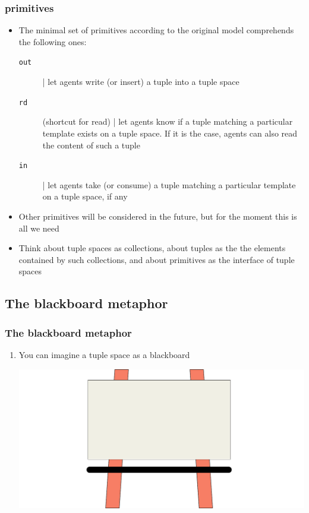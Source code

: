 \documentclass[presentation]{beamer}\mode<presentation>{\usetheme{AMSCesenaPurpleAndGold}}
\begin{document}
\begin{frame}%
\frametitle{ primitives}
	\begin{itemize}
		\item The minimal set of \alert{primitives} according to the original  model comprehends the following ones:
		\begin{description}
			\item[\texttt{out}] | let agents \alert{write} (or \alert{insert}) a tuple into a tuple space 
			
			\item[\texttt{rd}] (shortcut for \alert{read}) | let agents know if a tuple matching a particular template \alert{exists} on a tuple space. 
			If it is the case, agents can also read the content of such a tuple
			
			\item[\texttt{in}] | let agents \alert{take} (or \alert{consume}) a tuple matching a particular template on a tuple space, if any
		\end{description}
		
		\item Other primitives will be considered in the future, but for the moment this is all we need
		
		\item Think about tuple spaces as \alert{collections}, about tuples as the the elements contained by such collections, and about primitives as the \alert{interface} of tuple spaces
	\end{itemize}
\end{frame}

\subsection{The blackboard metaphor} 

\begin{frame}
\frametitle{The blackboard metaphor}

	\begin{enumerate}
		\item You can imagine a tuple space as a \alert{blackboard}
		\begin{center}
			\includegraphics[width=\linewidth]{./img/blackboard.pdf}
		\end{center}
	\end{enumerate}

\end{frame}
\end{document}
